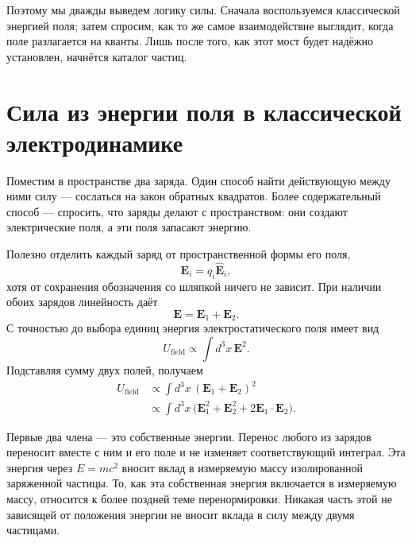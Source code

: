 Поэтому мы дважды выведем логику силы. Сначала воспользуемся классической энергией поля; затем спросим, как то же самое взаимодействие выглядит, когда поле разлагается на кванты. Лишь после того, как этот мост будет надёжно установлен, начнётся каталог частиц.

\section{Сила из энергии поля в классической электродинамике}

Поместим в пространстве два заряда. Один способ найти действующую между ними силу — сослаться на закон обратных квадратов. Более содержательный способ — спросить, что заряды делают с пространством: они создают электрические поля, а эти поля запасают энергию.

Полезно отделить каждый заряд от пространственной формы его поля,
\begin{equation}
\mathbf E_i=q_i\widehat{\mathbf E}_i,
\end{equation}
хотя от сохранения обозначения со шляпкой ничего не зависит. При наличии обоих зарядов линейность даёт
\begin{equation}
\mathbf{E}=\mathbf{E}_1+\mathbf{E}_2.
\end{equation}
С точностью до выбора единиц энергия электростатического поля имеет вид
\begin{equation}
U_{\text{field}}\propto\int d^3x\,\mathbf{E}^2.
\end{equation}
Подставляя сумму двух полей, получаем
\begin{align}
U_{\text{field}}
&\propto\int d^3x\,(\mathbf{E}_1+\mathbf{E}_2)^2 \\
&\propto\int d^3x\,\bigl(\mathbf{E}_1^2+\mathbf{E}_2^2
  +2\mathbf{E}_1\!\cdot\!\mathbf{E}_2\bigr).
\end{align}

Первые два члена — это собственные энергии. Перенос любого из зарядов переносит вместе с ним и его поле и не изменяет соответствующий интеграл. Эта энергия через \(E=mc^2\) вносит вклад в измеряемую массу изолированной заряженной частицы. То, как эта собственная энергия включается в измеряемую массу, относится к более поздней теме перенормировки. Никакая часть этой не зависящей от положения энергии не вносит вклада в силу между двумя частицами.

